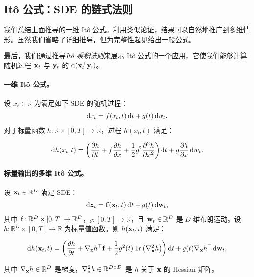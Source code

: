 
\subsection{It\^o 公式：SDE 的链式法则}
\label{subsec:ito-summary}
我们总结上面推导的一维 It\^o 公式。利用类似论证，结果可以自然地推广到多维情形。虽然我们省略了详细推导，但为完整性起见给出一般公式。

最后，我们通过推导\emph{It\^o 乘积法则}来展示 It\^o 公式的一个应用，它使我们能够计算随机过程 ${\mathbf{x}}_t$ 与 ${\mathbf{y}}_t$ 的 $\mathop{}\!\mathrm{d}({\mathbf{x}}_t^\top {\mathbf{y}}_t)$。

\paragraph{一维 It\^o 公式。}
设 $x_t \in \mathbb{R}$ 为满足如下 SDE 的随机过程：
\[
\mathop{}\!\mathrm{d} x_t = f(x_t, t) \mathop{}\!\mathrm{d} t + g(t) \mathop{}\!\mathrm{d} w_t.
\]
对于标量函数 $h \colon \mathbb{R} \times [0, T] \to \mathbb{R}$，过程 $h(x_t, t)$ 满足：
\begin{mdframed}
\[
\mathop{}\!\mathrm{d} h(x_t, t)
= \left( \frac{\partial h}{\partial t} + f \frac{\partial h}{\partial x}
+ \frac{1}{2} g^2 \frac{\partial^2 h}{\partial x^2} \right) \mathop{}\!\mathrm{d} t
+ g \frac{\partial h}{\partial x} \mathop{}\!\mathrm{d} w_t.
\]
\end{mdframed}


\paragraph{标量输出的多维 It\^o 公式。}
设 ${\mathbf{x}}_t \in \mathbb{R}^D$ 满足 SDE：
\[
\mathop{}\!\mathrm{d} {\mathbf{x}}_t = {\mathbf{f}}({\mathbf{x}}_t, t) \mathop{}\!\mathrm{d} t + g(t) \mathop{}\!\mathrm{d} {\mathbf{w}}_t,
\]
其中 ${\mathbf{f}} \colon \mathbb{R}^D \times [0, T] \to \mathbb{R}^D$，$g \colon [0, T] \to \mathbb{R}$，且 ${\mathbf{w}}_t \in \mathbb{R}^D$ 是 $D$ 维布朗运动。设 $h \colon \mathbb{R}^D \times [0, T] \to \mathbb{R}$ 为标量值函数。则 $h({\mathbf{x}}_t, t)$ 满足：
\begin{mdframed}
\begin{align}\label{eq:Ito-scalar}
    \mathop{}\!\mathrm{d} h({\mathbf{x}}_t, t)
= \left( \frac{\partial h}{\partial t}
+ \nabla_{{\mathbf{x}}} h^\top {\mathbf{f}}
+ \frac{1}{2} g^2(t) \operatorname{Tr} \left( \nabla^2_{{\mathbf{x}}} h \right) \right) \mathop{}\!\mathrm{d} t
+ g(t) \nabla_{{\mathbf{x}}} h^\top \mathop{}\!\mathrm{d} {\mathbf{w}}_t,
\end{align}
\end{mdframed}
其中 $\nabla_{{\mathbf{x}}} h \in \mathbb{R}^D$ 是梯度，$\nabla^2_{{\mathbf{x}}} h \in \mathbb{R}^{D \times D}$ 是 $h$ 关于 ${\mathbf{x}}$ 的 Hessian 矩阵。


